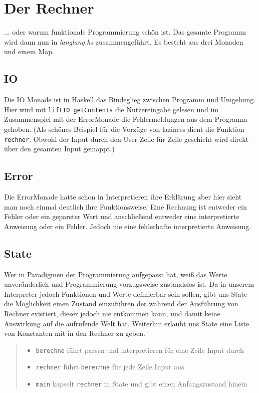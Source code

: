 \documentclass[12pt,german]{article}
\begin{document}
\section{Der Rechner}

... oder warum funktionale Programmierung schön ist. Das gesamte Programm wird dann nun in \textit{langlang.hs}
zusammengeführt. Es besteht aus drei Monaden und einem Map.
\subsection{IO }

Die IO Monade ist in Haskell das Bindeglieg zwischen Programm und
Umgebung. Hier wird mit \texttt{liftIO getContents} die Nutzereingabe
gelesen und im Zusammenspiel mit der ErrorMonade die Fehlermeldungen
aus dem Programm gehoben. (Als schönes Beispiel für die Vorzüge von
laziness dient die Funktion \texttt{rechner}. Obwohl der Input durch den User
Zeile für Zeile geschieht wird direkt über den gesamten Input gemappt.)\cite{IO14}

\subsection{Error}

Die ErrorMonade hatte schon in Interpretieren ihre Erklärung aber hier
sieht man noch einmal deutlich ihre Funktionsweise. Eine Rechnung ist
entweder ein Fehler oder ein geparster Wert und anschließend entweder
eine interpretierte Anweisung oder ein Fehler. Jedoch nie eine
fehlerhafte interpretierte Anweisung.\cite{ER14}

\subsection{State}

Wer in Paradigmen der Programmierung aufgepasst hat, weiß das Werte
unveränderlich und Programmierung vorzugsweise zustandslos ist. Da in
unserem Interpreter jedoch Funktionen und Werte definierbar sein
sollen, gibt uns State die Möglichkeit einen Zustand einzuführen der
während der Ausführung von Rechner existiert, dieser jedoch nie
entkommen kann, und damit keine Auswirkung auf die aufrufende Welt
hat. Weiterhin erlaubt uns State eine Liste von Konstanten mit in den
Rechner zu geben.\cite{ST14}


\begin{abstract}
  \noindent
  \begin{itemize}
  \item \texttt{berechne} führt parsen und interpretieren für eine
    Zeile Input durch
  \item \texttt{rechner} führt \texttt{berechne} für jede Zeile Input
    aus
  \item \texttt{main} kapselt \texttt{rechner} in State und gibt einen
    Anfangszustand hinein
  \end{itemize}
\end{abstract}
\end{document}
